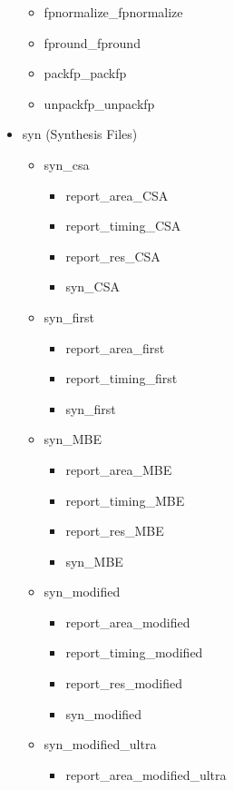 \begin{itemize}
\begin{itemize}
            \item fpnormalize\_fpnormalize
            \item fpround\_fpround
            \item packfp\_packfp
            \item unpackfp\_unpackfp
        \end{itemize}
    \item syn (Synthesis Files)
    \begin{itemize}
        \item syn\_csa
         \begin{itemize}
            \item report\_area\_CSA
            \item report\_timing\_CSA
            \item report\_res\_CSA
            \item syn\_CSA
        \end{itemize}
        \item syn\_first
         \begin{itemize}
            \item report\_area\_first
            \item report\_timing\_first
            \item syn\_first
        \end{itemize}
        \item syn\_MBE
         \begin{itemize}
            \item report\_area\_MBE
            \item report\_timing\_MBE
            \item report\_res\_MBE
            \item syn\_MBE
        \end{itemize}
        \item syn\_modified
         \begin{itemize}
            \item report\_area\_modified
            \item report\_timing\_modified
            \item report\_res\_modified
            \item syn\_modified
        \end{itemize}
        \item syn\_modified\_ultra
         \begin{itemize}
            \item report\_area\_modified\_ultra

\end{itemize}
\end{itemize}
\end{itemize}
